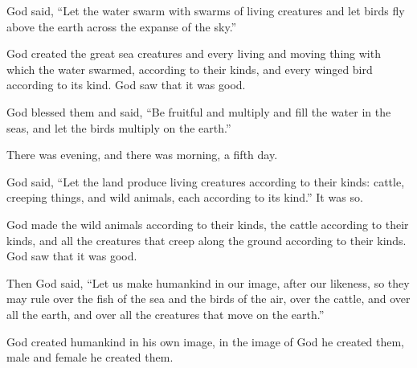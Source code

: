 \begin{scripture}
 God said, ``Let the water swarm with swarms of living creatures and let birds fly above the earth across the expanse of the sky.''
 God created the great sea creatures and every living and moving thing with which the water swarmed, according to their kinds, and every winged bird according to its kind. God saw that it was good.
 God blessed them and said, ``Be fruitful and multiply and fill the water in the seas, and let the birds multiply on the earth.''
 There was evening, and there was morning, a fifth day.
\everypar{}

 God said, ``Let the land produce living creatures according to their kinds: cattle, creeping things, and wild animals, each according to its kind.'' It was so.
 God made the wild animals according to their kinds, the cattle according to their kinds, and all the creatures that creep along the ground according to their kinds. God saw that it was good.
\everypar{}

 Then God said, ``Let us make humankind in our image, after our likeness, so they may rule over the fish of the sea and the birds of the air, over the cattle, and over all the earth, and over all the creatures that move on the earth.''
\everypar{}

 God created humankind in his own image, in the image of God he created them, male and female he created them.
\everypar{}


\end{scripture}
